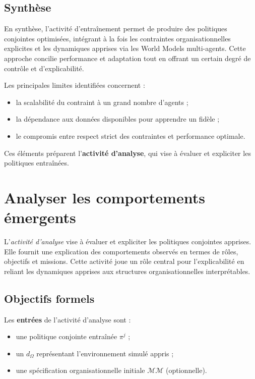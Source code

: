 \section{Synthèse}

En synthèse, l'activité d'entraînement permet de produire des politiques conjointes optimisées, intégrant à la fois les contraintes organisationnelles explicites et les dynamiques apprises via les World Models multi-agents.
Cette approche concilie performance et adaptation tout en offrant un certain degré de contrôle et d'explicabilité.

Les principales limites identifiées concernent :
\begin{itemize}
  \item la scalabilité du  contraint à un grand nombre d'agents ;
  \item la dépendance aux données disponibles pour apprendre un  fidèle ;
  \item le compromis entre respect strict des contraintes et performance optimale.
\end{itemize}

Ces éléments préparent l'\textbf{activité d'analyse}, qui vise à évaluer et expliciter les politiques entraînées.


\clearpage
\thispagestyle{empty}
\null
\newpage

\chapter{Analyser les comportements émergents}
\label{chap:analyzing}

L'\textit{activité d'analyse} vise à évaluer et expliciter les politiques conjointes apprises. Elle fournit une explication des comportements observés en termes de rôles, objectifs et missions. Cette activité joue un rôle central pour l'explicabilité en reliant les dynamiques apprises aux structures organisationnelles interprétables.


\section*{Objectifs formels}


Les \textbf{entrées} de l'activité d'analyse sont :
\begin{itemize}
  \item une politique conjointe entraînée $\pi^j$ ;
  \item un  $d_\Omega$ représentant l'environnement simulé appris ;
  \item une spécification organisationnelle initiale $\mathcal{MM}$ (optionnelle).
\end{itemize}

